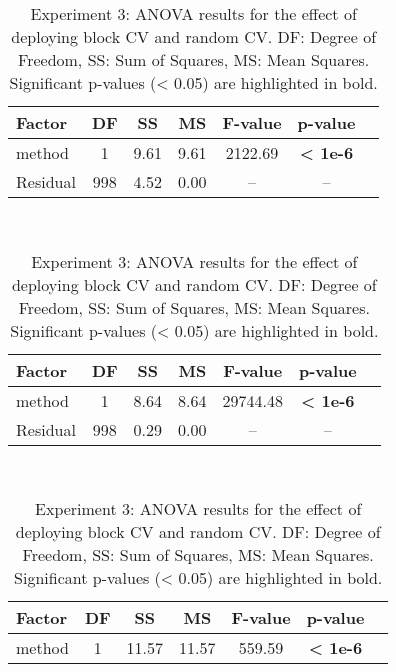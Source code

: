 \begin{table}[ht!]
    \centering
    \caption{Experiment 3: ANOVA results for the effect of deploying block CV and random CV. DF: Degree of Freedom, SS: Sum of Squares, MS: Mean Squares. Significant p-values (< 0.05) are highlighted in bold.}
    \label{tab:anova_all}
    \begin{minipage}{\textwidth}
    \centering
    \begin{tabular}{lcccccc}
    \toprule
    \textbf{Factor} & \textbf{DF} & \textbf{SS}    & \textbf{MS}    & \textbf{F-value}   & \textbf{p-value}      \\
    \midrule
    method    & 1    & 9.61    & 9.61   & 2122.69   & \textbf{< 1e-6} \\
    Residual  & 998 & 4.52    & 0.00   & --            & --            \\
    \bottomrule
    \end{tabular}
    \end{minipage}
    \\[1em]
    \begin{minipage}{\textwidth}
    \centering
    \begin{tabular}{lcccccc}
    \toprule
    \textbf{Factor} & \textbf{DF} & \textbf{SS}    & \textbf{MS}    & \textbf{F-value}   & \textbf{p-value}  \\
    \midrule
    method    & 1    & 8.64    & 8.64   & 29744.48  & \textbf{< 1e-6}          \\
    Residual  & 998  & 0.29    & 0.00   & --            & --           \\
    \bottomrule
    \end{tabular}
    \end{minipage}
    \\[1em]
    \begin{minipage}{\textwidth}
    \centering
    \begin{tabular}{lcccccc}
    \toprule
    \textbf{Factor} & \textbf{DF} & \textbf{SS}     & \textbf{MS}     & \textbf{F-value}   & \textbf{p-value}     \\
    \midrule
    method    & 1    & 11.57   & 11.57   & 559.59     & \textbf{< 1e-6}  \\

\end{tabular}
\end{minipage}
\end{table}
